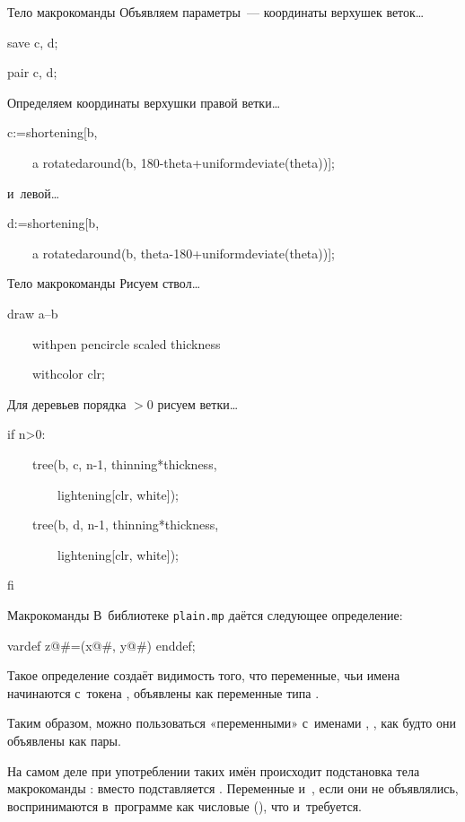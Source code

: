 
\begin{frame}{Тело макрокоманды }
Объявляем параметры~— координаты верхушек веток…
\begin{programlisting}
save c, d;\par
pair c, d;
\end{programlisting}

Определяем координаты верхушки правой ветки…
\begin{programlisting}
c:=shortening[b,\par
~~~~a rotatedaround(b, 180-theta+uniformdeviate(theta))];
\end{programlisting}
и~левой…
\begin{programlisting}
d:=shortening[b,\par
~~~~a rotatedaround(b, theta-180+uniformdeviate(theta))];
\end{programlisting}
\end{frame}


\begin{frame}{Тело макрокоманды }
Рисуем ствол…
\begin{programlisting}
draw a--b\par
~~~~withpen pencircle scaled thickness\par
~~~~withcolor clr;
\end{programlisting}

Для деревьев порядка ${}>0$ рисуем ветки…
\begin{programlisting}
if n>0:\par
~~~~tree(b, c, n-1, thinning*thickness,\par
~~~~~~~~lightening[clr, white]);\par
~~~~tree(b, d, n-1, thinning*thickness,\par
~~~~~~~~lightening[clr, white]);\par
fi
\end{programlisting}
\end{frame}


\begin{frame}{Макрокоманды }
В~библиотеке \nolinkurl{plain.mp} даётся следующее определение:
\begin{programlisting}
vardef z@\#=(x@\#, y@\#) enddef;
\end{programlisting}
Такое определение создаёт видимость того, что переменные, чьи имена начинаются
с~токена , объявлены как переменные типа .

Таким образом, можно пользоваться «переменными» с~именами ,
,  как будто они объявлены как пары.

На самом деле при употреблении таких имён происходит подстановка тела
макрокоманды : вместо  подставляется
. Переменные 
и~, если они не объявлялись, воспринимаются в~программе как
числовые (), что и~требуется.
\end{frame}

